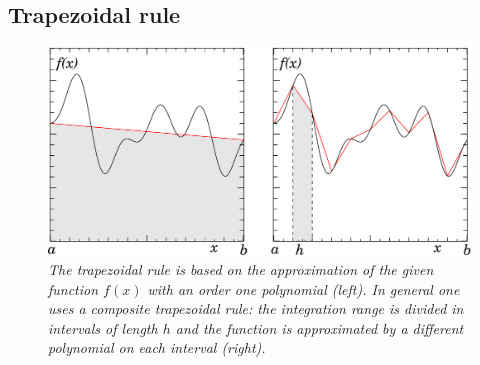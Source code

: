 \subsection{Trapezoidal rule}

\begin{figure}
  \centerline{\includegraphics[width=135mm]{figures/trapez}}
  \caption{\label{fig:trapez} \it The trapezoidal rule is based on the
    approximation of the given function $f(x)$ with an order one
    polynomial (left).  In general one uses a composite trapezoidal
    rule: the integration range is divided in intervals of length $h$
    and the function is approximated by a different polynomial on each
    interval (right).}
\end{figure}

